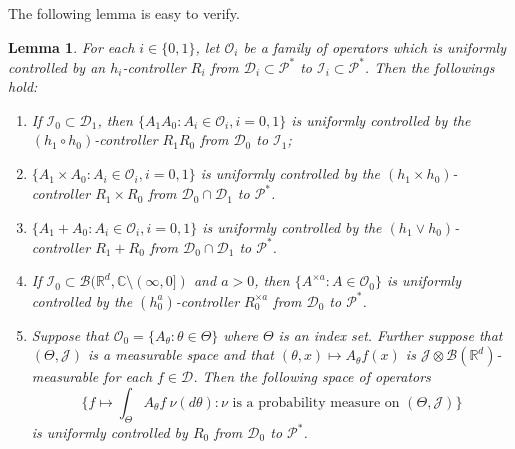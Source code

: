 \documentclass[12pt,a4paper]{amsart}
\theoremstyle{plain}
\newtheorem{lem}[thm]{Lemma}
\theoremstyle{definition}
\numberwithin{equation}{section}
\begin{document}
The following lemma is easy to verify.
\begin{lem}
  \label{lem: property of controllable operators}
  For each $i \in \{0,1\}$, let $\mathscr O_i$ be a family of operators which is  uniformly controlled by an $h_i$-controller $R_i$ from $\mathcal D_i \subset \mathcal P^*$ to $ \mathcal I_i \subset \mathcal P^*$. 
  Then the followings hold: 
  \begin{enumerate}
  \item 
    If $\mathcal I_0 \subset \mathcal D_1$, then $\{A_1A_0: A_i \in \mathscr O_i, i = 0,1\}$ is uniformly controlled by the $(h_1 \circ h_0)$-controller $R_1R_0$ from $\mathcal D_0$ to $\mathcal I_1$;
  \item
    $\{ A_1 \times A_0: A_i \in \mathscr O_i, i = 0,1\}$ is uniformly controlled by the $(h_1\times h_0)$-controller $R_1 \times R_0$ from $\mathcal D_0 \cap \mathcal D_1$ to $\mathcal P^*$.
  \item
    $\{ A_1 + A_0: A_i \in \mathscr O_i, i = 0,1\}$ is uniformly controlled by the $(h_1 \vee h_0)$-controller $R_1 + R_0$ from $\mathcal D_0 \cap \mathcal D_1$ to $\mathcal P^*$. 
\item 
    If $\mathcal I_0 \subset \mathcal B(\mathbb R^d, \mathbb C \setminus (\infty, 0])$ and $a>0$, then $\{A^{\times a} : A \in \mathscr O_0\}$ is uniformly controlled by the $(h_0^a)$-controller $R_0^{\times a}$ from $\mathcal D_0$ to $\mathcal P^*$.
  \item
    Suppose that $\mathscr O_0 = \{A_\theta: \theta \in \Theta \}$ where $\Theta$ is an index set. 
    Further suppose that $(\Theta, \mathcal J )$ is a measurable space and that $(\theta,x) \mapsto A_\theta f(x)$ is $\mathcal J \otimes \mathcal B(\mathbb R^d)$-measurable for each $f\in \mathcal D$.
    Then the following space of operators
    \[
      \Big\{ f \mapsto \int_{\Theta} A_\theta f~\nu(d\theta) : \nu \text{ is a probability measure on } (\Theta, \mathcal J) \Big\}
    \] 
    is uniformly controlled by $R_0$ from $\mathcal D_0$ to $\mathcal P^*$.
\end{enumerate}  
\end{lem}
\end{document}
